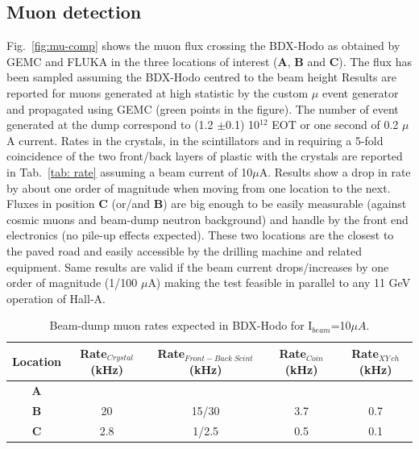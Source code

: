 \subsection{Muon detection}
Fig.~\ref{fig:mu-comp} shows the muon flux crossing the BDX-Hodo  as obtained by GEMC and FLUKA  in the  three locations of interest ({\bf A}, {\bf B} and {\bf C}).
The flux has been sampled assuming the BDX-Hodo centred  to the beam height  Results are reported for muons generated at high statistic by the custom $\mu$ event generator and propagated using GEMC (green points in the figure).
The number of event generated at the dump correspond to  (1.2 $\pm$0.1) 10$^{12}$ EOT or one second of 0.2 $\mu$A current.
Rates in the crystals, in the scintillators and in requiring a 5-fold coincidence of the two front/back layers of plastic with the crystals are reported in Tab.~\ref{tab: rate} assuming a beam current of 10$\mu$A. Results show a drop in rate by about one order of magnitude when moving from one location to the next. 
Fluxes in position {\bf C} (or/and {\bf B}) are big enough to be easily measurable (against cosmic muons and beam-dump neutron background) and handle by the front end electronics (no pile-up effects expected). These two locations are the closest to the paved road and easily accessible by the drilling machine and related equipment. Same results are valid if the beam current drops/increases by one order of magnitude (1/100 $\mu$A) making the test feasible in parallel to any 11 GeV operation of Hall-A.

\begin{table}[htp]
\caption{Beam-dump muon rates expected in BDX-Hodo for I$_{beam}$=10$\mu A$.}
\begin{center}
\begin{tabular}{|c|c|c|c|c|}
\hline
Location & Rate$_{Crystal}$  (kHz)&  Rate$_{Front-Back \;Scint} $(kHz) & Rate$_{Coin}$ (kHz) & Rate$_{XY\, ch} $(kHz)\\
\hline\hline
{\bf A}  &   &    &  & \\
 \hline
{\bf B} & 20 &  15/30 & 3.7 & 0.7\\
 \hline
{\bf C} & 2.8 &  1/2.5 & 0.5 & 0.1 \\
\hline\hline
\end{tabular}
\end{center}
\label{tab:rate}
\end{table}%




